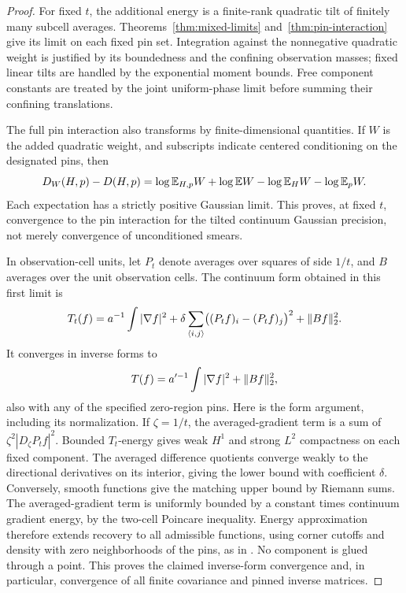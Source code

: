 \begin{proof}
For fixed \(t\), the additional energy is a finite-rank quadratic
tilt of finitely many subcell averages.  Theorems~\ref{thm:mixed-limits}
and~\ref{thm:pin-interaction} give its limit on each fixed pin set.
Integration against the nonnegative quadratic weight is justified
by its boundedness and the confining observation masses; fixed
linear tilts are handled by the exponential moment bounds.
Free component constants are treated by the joint uniform-phase
limit before summing their confining translations.

The full pin interaction also transforms by finite-dimensional
quantities.  If \(W\) is the added quadratic weight, and subscripts
indicate centered conditioning on the designated pins, then
\begin{equation}\label{eq:op-tilted-interaction}
 D_W(H,p)-D(H,p)
 =\log\mathbb E_{H,p}W+\log\mathbb E W
       -\log\mathbb E_HW-\log\mathbb E_pW .
\end{equation}
Each expectation has a strictly positive Gaussian limit.  This
proves, at fixed \(t\), convergence to the pin interaction for the
tilted continuum Gaussian precision, not merely convergence of
unconditioned smears.

In observation-cell units, let \(P_t\) denote averages over squares
of side \(1/t\), and \(B\) averages over the unit observation cells.
The continuum form obtained in this first limit is
\begin{equation}\label{eq:op-continuum-form}
 T_t(f)=a^{-1}\int|\nabla f|^2
       +\delta\sum_{\langle i,j\rangle}
                  \bigl((P_tf)_i-(P_tf)_j\bigr)^2
       +\lVert Bf\rVert_2^2 .
\end{equation}
It converges in inverse forms to
\begin{equation}\label{eq:op-limit-form}
                   T(f)=a'^{-1}\int|\nabla f|^2+\lVert Bf\rVert_2^2,
\end{equation}
also with any of the specified zero-region pins.  Here is the
form argument, including its normalization.  If \(\zeta=1/t\),
the averaged-gradient term is a sum of
\(\zeta^2|D_\zeta P_tf|^2\).  Bounded \(T_t\)-energy gives weak
\(H^1\) and strong \(L^2\) compactness on each fixed component.
The averaged difference quotients converge weakly to the
directional derivatives on its interior, giving the lower bound
with coefficient \(\delta\).  Conversely, smooth functions give
the matching upper bound by Riemann sums.  The averaged-gradient
term is uniformly bounded by a constant times continuum gradient
energy, by the two-cell Poincare inequality.  Energy approximation
therefore extends recovery to all admissible functions, using
corner cutoffs and density with zero neighborhoods of the pins,
as in .  No component is glued through a point.
This proves the claimed inverse-form convergence and, in
particular, convergence of all finite covariance and pinned
inverse matrices.


\end{proof}
